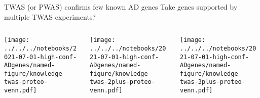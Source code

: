 \documentclass[aspectratio=169]{beamer}
\begin{document}
\begin{frame}{TWAS (or PWAS) confirms few known AD genes}
	{Take genes supported by multiple TWAS experiments?}
\begin{columns}[t]
\begin{column}{0.35\textwidth}

\texttt{[image: ../../../notebooks/2021-07-01-high-conf-ADgenes/named-figure/knowledge-twas-proteo-venn.pdf]}
\end{column}
\begin{column}{0.35\textwidth}

\texttt{[image: ../../../notebooks/2021-07-01-high-conf-ADgenes/named-figure/knowledge-twas-2plus-proteo-venn.pdf]}
\end{column}

\begin{column}{0.35\textwidth}

\texttt{[image: ../../../notebooks/2021-07-01-high-conf-ADgenes/named-figure/knowledge-twas-3plus-proteo-venn.pdf]}
\end{column}
\end{columns}
\end{frame}
\end{document}

